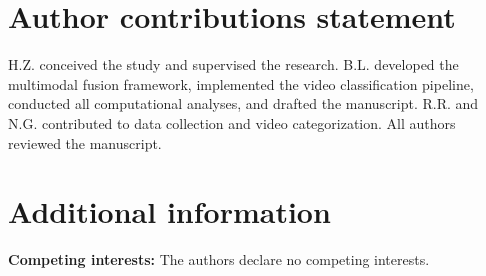 \documentclass[fleqn,10pt]{wlscirep}
\begin{document}
\section*{Author contributions statement}

H.Z. conceived the study and supervised the research. B.L. developed the multimodal fusion framework, implemented the video classification pipeline, conducted all computational analyses, and drafted the manuscript. R.R. and N.G. contributed to data collection and video categorization. All authors reviewed the manuscript.

\section*{Additional information}

\textbf{Competing interests:} The authors declare no competing interests.
\end{document}
